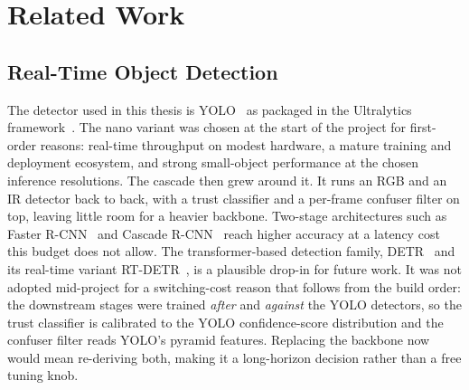 \chapter{Related Work}
\label{ch:literature}

\section{Real-Time Object Detection}
\label{sec:lit_objdet}

The detector used in this thesis is YOLO~\cite{redmon2016yolo} as packaged in the Ultralytics framework~\cite{ultralytics2024}. The nano variant was chosen at the start of the project for first-order reasons: real-time throughput on modest hardware, a mature training and deployment ecosystem, and strong small-object performance at the chosen inference resolutions. The cascade then grew around it. It runs an RGB and an IR detector back to back, with a trust classifier and a per-frame confuser filter on top, leaving little room for a heavier backbone. Two-stage architectures such as Faster R-CNN~\cite{ren2015fasterrcnn} and Cascade R-CNN~\cite{cai2018cascade} reach higher accuracy at a latency cost this budget does not allow. The transformer-based detection family, DETR~\cite{carion2020detr} and its real-time variant RT-DETR~\cite{zhao2024rtdetr}, is a plausible drop-in for future work. It was not adopted mid-project for a switching-cost reason that follows from the build order: the downstream stages were trained \emph{after} and \emph{against} the YOLO detectors, so the trust classifier is calibrated to the YOLO confidence-score distribution and the confuser filter reads YOLO's pyramid features. Replacing the backbone now would mean re-deriving both, making it a long-horizon decision rather than a free tuning knob.

